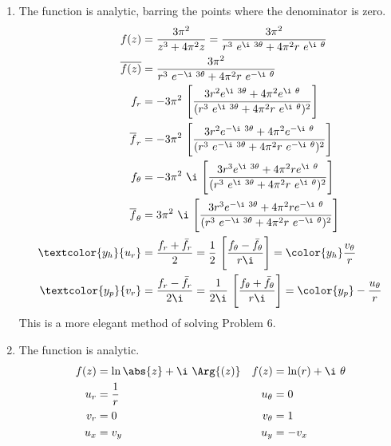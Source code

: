 \begin{enumerate}
    \item The function is \textcolor{y_h}{analytic}, barring the points where the
          denominator is zero.
          \begin{align}
              f(z)                 & = \frac{3\pi^2}{z^3 + 4\pi^2 z}
              = \frac{3\pi^2}{r^3\ e^{\i\ 3\theta} + 4\pi^2 r\ e^{\i\ \theta}}   \\
              \overline{f(z)}      &
              = \frac{3\pi^2}{r^3\ e^{-\i\ 3\theta} + 4\pi^2 r\ e^{-\i\ \theta}} \\
              f_r                  & = -3\pi^2
              \ \Bigg[ \frac{3r^2 e^{\i\ 3\theta} + 4\pi^2 e^{\i\ \theta}}
              {(r^3\ e^{\i\ 3\theta} + 4\pi^2 r\ e^{\i\ \theta})^2} \Bigg]       \\
              \overline{f}_r       & = -3\pi^2
              \ \Bigg[\frac{3r^2 e^{-\i\ 3\theta} + 4\pi^2 e^{-\i\ \theta}}
              {(r^3\ e^{-\i\ 3\theta} + 4\pi^2 r\ e^{-\i\ \theta})^2} \Bigg]     \\
              f_\theta             & = -3\pi^2\ \i
              \ \Bigg[ \frac{3r^3 e^{\i\ 3\theta} + 4\pi^2r e^{\i\ \theta}}
              {(r^3\ e^{\i\ 3\theta} + 4\pi^2 r\ e^{\i\ \theta})^2} \Bigg]       \\
              \overline{f}_\theta  & = 3\pi^2\ \i
              \ \Bigg[\frac{3r^3 e^{-\i\ 3\theta} + 4\pi^2r e^{-\i\ \theta}}
              {(r^3\ e^{-\i\ 3\theta} + 4\pi^2 r\ e^{-\i\ \theta})^2} \Bigg]     \\
              \textcolor{y_h}{u_r} & = \frac{f_r + \bar{f}_r}{2}
              = \frac{1}{2}\ \Bigg[\frac{f_\theta - \bar{f}_\theta}{r \i}\Bigg]
              = \color{y_h} \frac{v_\theta}{r}                                   \\
              \textcolor{y_p}{v_r} & = \frac{f_r - \bar{f}_r}{2\i}
              = \frac{1}{2\i}\ \Bigg[\frac{f_\theta + \bar{f}_\theta}{r\i}\Bigg]
              = \color{y_p} -\frac{u_\theta}{r}
          \end{align}
          This is a more elegant method of solving Problem $ 6 $.

    \item The function is \textcolor{y_h}{analytic}.
          \begin{align}
              f(z)     & = \ln{\abs{z}} + \i\ \Arg{(z)} &
              f(z)     & = \ln(r) + \i\ \theta            \\
              u_r      & = \frac{1}{r}                  &
              u_\theta & = 0                              \\
              v_r      & = 0                            &
              v_\theta & = 1                              \\
              u_x      & = v_y                          &
              u_y      & = -v_x
          \end{align}


\end{enumerate}

